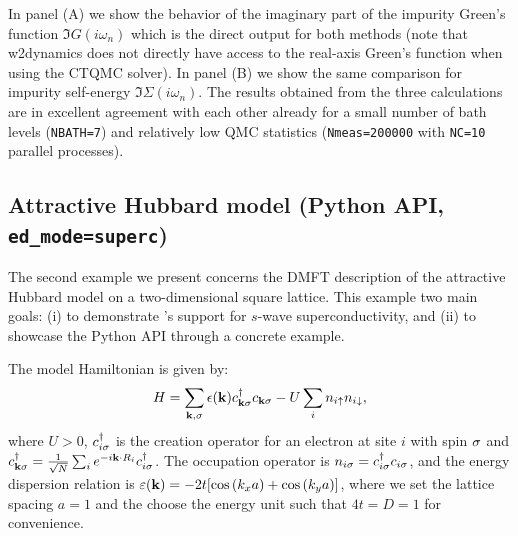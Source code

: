 \documentclass[edipack_sp.tex]{subfiles}
\begin{document}
In panel (A) we show the behavior of the imaginary part of the impurity Green's function $\Im{G}(i\omega_n)$ which is the direct output for both methods (note that w2dynamics does not directly have access to the real-axis Green's function when using the CTQMC solver). In panel (B) we show the same comparison for impurity self-energy $\Im{\Sigma}(i\omega_n)$. 
The results obtained from the three calculations are in excellent agreement with each other already for a small number of bath levels ({\tt NBATH=7}) and relatively low QMC statistics ({\tt Nmeas=200000} with {\tt NC=10} parallel processes).   



















\subsection{Attractive Hubbard model (Python API, {\tt ed\_mode=superc})}\label{SecExamplesAHM}
The second example we present concerns the DMFT description of the 
attractive Hubbard model \cite{Caffarel1994PRL,Toschi2005NJP,Toschi2005PRB} on a two-dimensional square lattice. 
This  example two main goals: (i) to demonstrate \NAME's support for $s$-wave superconductivity, and (ii) to showcase the Python API through a concrete example. 

The 
model Hamiltonian is given by:
$$
H = \sum_{{\bf k},\sigma} \epsilon({\bf k}) c^\dagger_{{\bf k}\sigma} c_{{\bf k}\sigma} 
    - U \sum_i n_{i\uparrow} n_{i\downarrow},
$$
where $U > 0$, $c^\dagger_{i\sigma}$ 
is the creation operator for an electron at site $i$ with spin $\sigma$ and $c^\dagger_{{\bf k}\sigma} = \tfrac{1}{\sqrt{N}} 
\sum_i e^{-i{\bf k} \cdot R_i} c^\dagger_{i\sigma}$. 
The occupation operator is $n_{i\sigma} = c^\dagger_{i\sigma} c_{i\sigma}$, and 
the energy dispersion relation is $\varepsilon({\bf k})=-2t[\cos{(k_x a)}+
\cos{(k_y a)}]$, where we set the lattice spacing 
$a=1$  and the choose the energy unit such that $4t=D=1$ for convenience.
\end{document}
